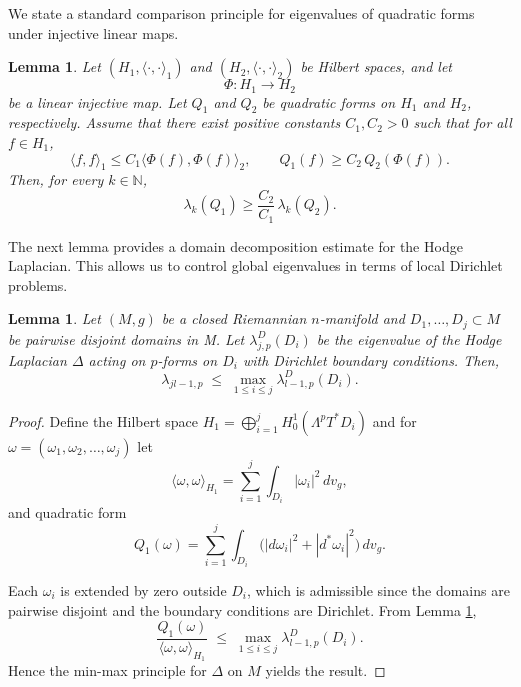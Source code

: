 \documentclass[10 pt, reqno]{amsart}
\newtheorem{lemma}[theorem]{Lemma}
\begin{document}
\par We state a standard comparison principle for eigenvalues of quadratic forms under injective linear maps.
\begin{lemma}
\label{lem:comparing eigenvalues by injective map}
Let $(H_1,\langle\cdot,\cdot\rangle_1)$ and $(H_2,\langle\cdot,\cdot\rangle_2)$ be Hilbert spaces, and let
\[
\Phi : H_1 \to H_2
\]
be a linear injective map.  
Let $Q_1$ and $Q_2$ be quadratic forms on $H_1$ and $H_2$, respectively.  
Assume that there exist positive constants $C_1,C_2>0$ such that for all $f\in H_1$,
\[
\langle f,f\rangle_1 \le C_1 \langle \Phi(f),\Phi(f)\rangle_2,
\qquad
Q_1(f) \ge C_2\, Q_2(\Phi(f)).
\]
Then, for every $k\in\mathbb{N}$,
\[
\lambda_k(Q_1) \ge \frac{C_2}{C_1}\,\lambda_k(Q_2).
\]
\end{lemma}

The next lemma provides a domain decomposition estimate for the Hodge Laplacian. This allows us to control global eigenvalues in terms of local Dirichlet problems.

\begin{lemma}
\label{lem: manifoldanddirichlet}    
Let $(M,g)$ be a closed Riemannian $n$-manifold and $D_1,\dots,D_j \subset M$ be pairwise disjoint domains in M. Let $\lambda^{D}_{j,p}(D_i)$ be the eigenvalue of the Hodge Laplacian $\Delta$ acting on $p$-forms on $D_i$
with Dirichlet boundary conditions. Then, 
\begin{equation*}
\lambda_{jl - 1,p}
\;\le\;
\max_{1 \le i \le j} \lambda^{D}_{l-1,p}(D_i). 
\end{equation*}
\end{lemma}

\begin{proof}

Define the Hilbert space $H_1 = \bigoplus_{i=1}^{j} H^1_0\!\left(\Lambda^p T^*D_i\right)$ and for $\omega=\left(\omega_1,\omega_2,\dots,\omega_j\right)$ let
\[
\langle \omega,\omega \rangle_{H_1}
=
\sum_{i=1}^{j} \int_{D_i} |\omega_i|^2 \, dv_g,
\]
and quadratic form
\[
Q_1(\omega)
=
\sum_{i=1}^{j}
\int_{D_i}
\bigl(
|d\omega_i|^2 + |d^*\omega_i|^2
\bigr)\, dv_g.
\]


Each $\omega_i$ is extended by zero outside $D_i$, which is admissible since the domains are pairwise disjoint and the boundary conditions are Dirichlet.
From Lemma \ref{lem:comparing eigenvalues by injective map},
\[
\frac{Q_1(\omega)}{\langle \omega,\omega \rangle_{H_1}}
\;\le\;
\max_{1 \le i \le j} \lambda^{D}_{l-1,p}(D_i).
\]
Hence the min-max principle for $\Delta$ on $M$ yields the result.
\end{proof}
\end{document}

